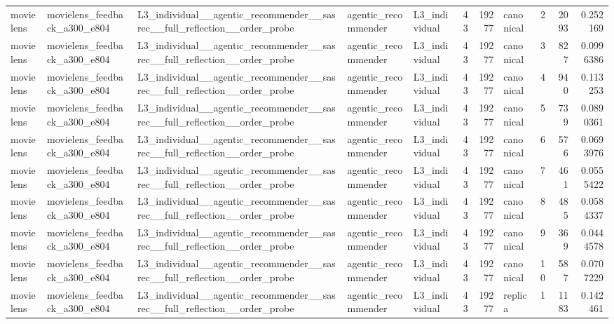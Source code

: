 \begin{table}[htbp!]
\begin{tabular}{lllllrrlrrr}
movielens & movielens\_feedback\_a300\_e804 & L3\_individual\_\_agentic\_recommender\_\_sasrec\_\_full\_reflection\_\_order\_probe & agentic\_recommender & L3\_individual & 43 & 19277 & canonical & 2 & 2093 & 0.252169 \\
movielens & movielens\_feedback\_a300\_e804 & L3\_individual\_\_agentic\_recommender\_\_sasrec\_\_full\_reflection\_\_order\_probe & agentic\_recommender & L3\_individual & 43 & 19277 & canonical & 3 & 827 & 0.0996386 \\
movielens & movielens\_feedback\_a300\_e804 & L3\_individual\_\_agentic\_recommender\_\_sasrec\_\_full\_reflection\_\_order\_probe & agentic\_recommender & L3\_individual & 43 & 19277 & canonical & 4 & 940 & 0.113253 \\
movielens & movielens\_feedback\_a300\_e804 & L3\_individual\_\_agentic\_recommender\_\_sasrec\_\_full\_reflection\_\_order\_probe & agentic\_recommender & L3\_individual & 43 & 19277 & canonical & 5 & 739 & 0.0890361 \\
movielens & movielens\_feedback\_a300\_e804 & L3\_individual\_\_agentic\_recommender\_\_sasrec\_\_full\_reflection\_\_order\_probe & agentic\_recommender & L3\_individual & 43 & 19277 & canonical & 6 & 576 & 0.0693976 \\
movielens & movielens\_feedback\_a300\_e804 & L3\_individual\_\_agentic\_recommender\_\_sasrec\_\_full\_reflection\_\_order\_probe & agentic\_recommender & L3\_individual & 43 & 19277 & canonical & 7 & 461 & 0.0555422 \\
movielens & movielens\_feedback\_a300\_e804 & L3\_individual\_\_agentic\_recommender\_\_sasrec\_\_full\_reflection\_\_order\_probe & agentic\_recommender & L3\_individual & 43 & 19277 & canonical & 8 & 485 & 0.0584337 \\
movielens & movielens\_feedback\_a300\_e804 & L3\_individual\_\_agentic\_recommender\_\_sasrec\_\_full\_reflection\_\_order\_probe & agentic\_recommender & L3\_individual & 43 & 19277 & canonical & 9 & 369 & 0.0444578 \\
movielens & movielens\_feedback\_a300\_e804 & L3\_individual\_\_agentic\_recommender\_\_sasrec\_\_full\_reflection\_\_order\_probe & agentic\_recommender & L3\_individual & 43 & 19277 & canonical & 10 & 587 & 0.0707229 \\
movielens & movielens\_feedback\_a300\_e804 & L3\_individual\_\_agentic\_recommender\_\_sasrec\_\_full\_reflection\_\_order\_probe & agentic\_recommender & L3\_individual & 43 & 19277 & replica & 1 & 1183 & 0.142461 \\

\end{tabular}
\end{table}
